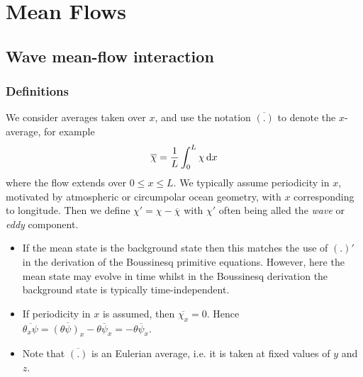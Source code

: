 \documentclass{jknotes}
\begin{document}
\begin{center}
\end{center}
		
\section{Mean Flows}
\subsection{Wave mean-flow interaction}
\subsubsection{Definitions}
We consider averages taken over $x$, and use the notation $\overline{(.)}$ to
denote the $x$-average, for example
\begin{equation}
	\overline{\chi} = \frac{1}{L} \int_0^L \chi \, \diffd x
\end{equation}
where the flow extends over $ 0 \le x \le L$. We typically assume periodicity
in $x$, motivated by atmospheric or circumpolar ocean geometry, with $x$
corresponding to longitude. Then we define $\chi' = \chi - \overline{\chi}$
with $\chi'$ often being alled the \emph{wave} or \emph{eddy} component. 
\begin{itemize}
	\item If the mean state is the background state then this matches the use
		of $(.)'$ in the derivation of the Boussinesq primitive equations.
		However, here the mean state may evolve in time whilst in the
		Boussinesq derivation the background state is typically
		time-independent.

	\item If periodicity in $x$ is assumed, then $\overline{\chi_x} = 0$.
		Hence $\overline{\theta_x \psi} = \overline{(\theta \psi)_x} -
		\overline{\theta \psi_x} = -\overline{\theta \psi_x}$. 

	\item Note that $\overline{(.)}$ is an Eulerian average, i.e. it is taken
		at fixed values of $y$ and $z$.
\end{itemize}
\end{document}

